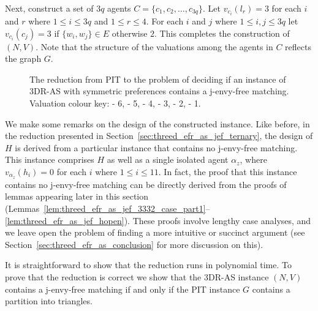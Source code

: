 Next, construct a set of $3q$ agents $C = \{ c_1, c_2, \dots, c_{3q} \}$. Let $v_{c_i}(l_r) = 3$ for each $i$ and $r$ where $1\leq i \leq 3q$ and $1\leq r \leq 4$. For each $i$ and $j$ where $1\leq i, j \leq 3q$ let $v_{c_i}(c_j) = 3$ if $\{ w_i, w_j \} \in E$ otherwise $2$. This completes the construction of $(N, V)$. Note that the structure of the valuations among the agents in $C$ reflects the graph $G$.
%
\begin{figure}
    \centering
    \vspace*{0.2cm}
    
    \vspace*{0.5cm}
    \caption[The reduction from PIT to the problem of deciding if an instance of 3DR-AS with symmetric preferences contains a j-envy-free matching]{The reduction from PIT to the problem of deciding if an instance of 3DR-AS with symmetric preferences contains a j-envy-free matching. Valuation colour key: \textcolor{figurecolourschemewt6}{\figurecolorschemewtsixname} - 6, \textcolor{figurecolourschemewt5}{\figurecolorschemewtfivename} - 5, \textcolor{figurecolourschemewt4}{\figurecolorschemewtfourname} - 4, \textcolor{figurecolourschemewt3}{\figurecolorschemewtthreename} - 3, \textcolor{figurecolourschemewt2}{\figurecolorschemewttwoname} - 2, \textcolor{figurecolourschemewt1}{\figurecolorschemewtonename} - 1.}
    \label{fig:threed_efr_as_jef_symmetric_reduction}
\end{figure}

We make some remarks on the design of the constructed instance. Like before, in the reduction presented in Section~\ref{sec:threed_efr_as_jef_ternary}, the design of $H$ is derived from a particular instance that contains no j-envy-free matching. This instance comprises $H$ as well as a single isolated agent $\alpha_{z}$, where $v_{\alpha_{z}}(h_i) = 0$ for each $i$ where $1\leq i \leq 11$. In fact, the proof that this instance contains no j-envy-free matching can be directly derived from the proofs of lemmas appearing later in this section (Lemmas~\ref{lem:threed_efr_as_jef_3332_case_part1}--\ref{lem:threed_efr_as_jef_hopen}). These proofs involve lengthy case analyses, and we leave open the problem of finding a more intuitive or succinct argument (see Section~\ref{sec:threed_efr_as_conclusion} for more discussion on this).

It is straightforward to show that the reduction runs in polynomial time. To prove that the reduction is correct we show that the 3DR-AS instance $(N, V)$ contains a j-envy-free matching if and only if the PIT instance $G$ contains a partition into triangles.

